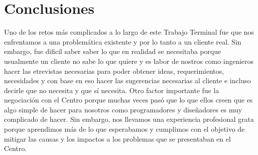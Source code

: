 \section{Conclusiones}

Uno de los retos más complicados a lo largo de este Trabajo Terminal fue que nos enfrentamos a una problemática existente y por lo tanto a un cliente real. Sin embargo, fue dificil saber saber lo que en realidad se necesitaba porque usualmente un cliente no sabe lo que quiere y es labor de nostros como ingenieros hacer las etrevistas necesarias para poder obtener ideas, requerimientos, necesidades y con base en eso hacer las sugerencias necesarias al cliente e incluso decirle que no necesita y que sí necesita. Otro factor importante fue la negociación con el Centro porque muchas veces pasó que lo que ellos creen que es algo simple de hacer para nosotros como programadores y diseñadores es muy complicado de hacer. Sin embargo, nos llevamos una experiencia profesional grata porque aprendimos más de lo que esperabamos y cumplimos con el objetivo de mitigar las causas y los impactos a los problemas que se presentaban en el Centro.